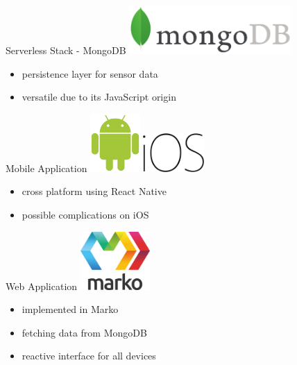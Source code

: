 \documentclass[aspectratio=1610]{beamer}
\begin{document}
  \begin{frame}{Serverless Stack - MongoDB}
    \includegraphics[height=5em]{mongodb-logo}

    \vspace*{1.5em}

    \begin{itemize}
      \item persistence layer for sensor data
      \item versatile due to its JavaScript origin
    \end{itemize}
  \end{frame}

  \begin{frame}{Mobile Application}
    \includegraphics[align=c,height=6em]{android-logo}
    \hspace*{2em}
    \includegraphics[align=c,height=4em]{ios-logo}

    \vspace*{2em}

    \begin{itemize}
      \item cross platform using React Native
      \item possible complications on iOS
    \end{itemize}
  \end{frame}

  \begin{frame}{Web Application}
    \includegraphics[height=6em]{marko-logo}

    \vspace*{2em}

    \begin{itemize}
      \item implemented in Marko
      \item fetching data from MongoDB
      \item reactive interface for all devices
    \end{itemize}
  \end{frame}
\end{document}
